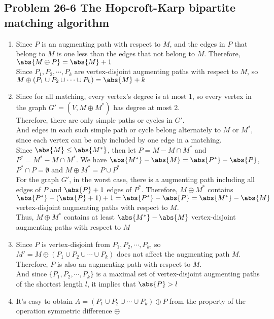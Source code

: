 \subsection*{Problem 26-6 The Hopcroft-Karp bipartite matching algorithm}
\begin{enumerate}
	\item	Since $P$ is an augmenting path with respect to $M$, and the edges in $P$ that belong to $M$ is one less than the edges that not belong to $M$. Therefore, $\abs{M \oplus P} = \abs{M} + 1$ \\
		Since $P_1, P_2, \cdots, P_k$ are vertex-disjoint augmenting paths with respect to $M$, so $M \oplus (P_1 \cup P_2 \cup \cdots \cup P_k) = \abs{M} + k$
	\item	Since for all matching, every vertex's degree is at most 1, so every vertex in the graph $G' = (V, M \oplus M^{*})$ has degree at most 2. \\
		Therefore, there are only simple paths or cycles in $G'$. \\
		And edges in each such simple path or cycle belong alternately to $M$ or $M^{*}$, since each vertex can be only included by one edge in a matching. \\
		Since $\abs{M} \leq \abs{M^{*}}$, then let $P = M - M \cap M^{*}$ and $P^{*} = M^{*} - M \cap M^{*}$. We have $\abs{M^{*}} - \abs{M} = \abs{P^{*}} - \abs{P}$, $P^{*} \cap P = \emptyset$ and $M \oplus M^{*} = P \cup P^{*}$ \\
		For the graph $G'$, in the worst case, there is a augmenting path including all edges of $P$ and $\abs{P} + 1$ edges of $P^{*}$. Therefore, $M \oplus M^{*}$ contains $\abs{P^{*}} - (\abs{P} + 1) + 1 = \abs{P^{*}} - \abs{P} = \abs{M^{*}} - \abs{M}$ vertex-disjoint augmenting paths with respect to $M$. \\
		Thus, $M \oplus M^{*}$ contains at least $\abs{M^{*}} - \abs{M}$ vertex-disjoint augmenting paths with respect to $M$
	\item	Since $P$ is vertex-disjoint from $P_1, P_2, \cdots, P_k$, so $M' = M \oplus (P_1 \cup P_2 \cup \cdots \cup P_k)$ does not affect the augmenting path $M$. Therefore, $P$ is also an augmenting path with respect to $M$. \\
		And since $\{P_1, P_2, \cdots, P_k\}$ is a maximal set of vertex-disjoint augmenting paths of the shortest length $l$, it implies that $\abs{P} > l$
	\item	It's easy to obtain $A = (P_1 \cup P_2 \cup \cdots \cup P_k) \oplus P$ from the property of the operation symmetric difference $\oplus$ \\

\end{enumerate}
